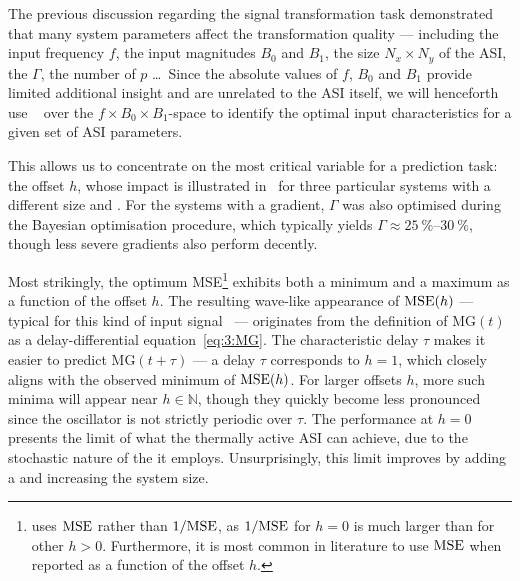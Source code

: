 The previous discussion regarding the signal transformation task demonstrated that many system parameters affect the transformation quality --- including the input frequency $f$, the input magnitudes $B_0$ and $B_1$, the size $N_x \times N_y$ of the ASI, the  $\Gamma$, the number of  $p$ \dots\,
Since the absolute values of $f$, $B_0$ and $B_1$ provide limited additional insight and are unrelated to the ASI itself, we will henceforth use ~\cite{BayesOpt_Mockus1975} over the $f \times B_0 \times B_1$-space to identify the optimal input characteristics for a given set of ASI parameters. \par %
This allows us to concentrate on the most critical variable for a prediction task: the offset $h$, whose impact is illustrated in~ for three particular systems with a different size and .
For the systems with a gradient, $\Gamma$ was also optimised during the Bayesian optimisation procedure, which typically yields $\Gamma \approx \SIrange{25}{30}{\percent}$, though less severe gradients also perform decently. \par
Most strikingly, the optimum MSE\footnote{
	 uses $\mathrm{MSE}$ rather than $1/\mathrm{MSE}$, as $1/\mathrm{MSE}$ for $h=0$ is much larger than for other $h > 0$.
	Furthermore, it is most common in literature to use $\mathrm{MSE}$ when reported as a function of the offset $h$.
} exhibits both a minimum and a maximum as a function of the offset $h$.
The resulting wave-like appearance of $\mathrm{MSE}(h)$ --- typical for this kind of input signal~\cite{NeuromorphicFewShot,ForecastingNeuralODE} --- originates from the definition of $\mathrm{MG}(t)$ as a delay-differential equation~\eqref{eq:3:MG}.
The characteristic delay $\tau$ makes it easier to predict $\mathrm{MG}(t + \tau)$ --- a delay $\tau$ corresponds to $h=1$, which closely aligns with the observed minimum of $\mathrm{MSE}(h)$.
For larger offsets $h$, more such minima will appear near $h \in \mathbb{N}$, though they quickly become less pronounced since the oscillator is not strictly periodic over $\tau$.
The performance at $h=0$ presents the limit of what the thermally active ASI  can achieve, due to the stochastic nature of the  it employs.
Unsurprisingly, this limit improves by adding a  and increasing the system size.

